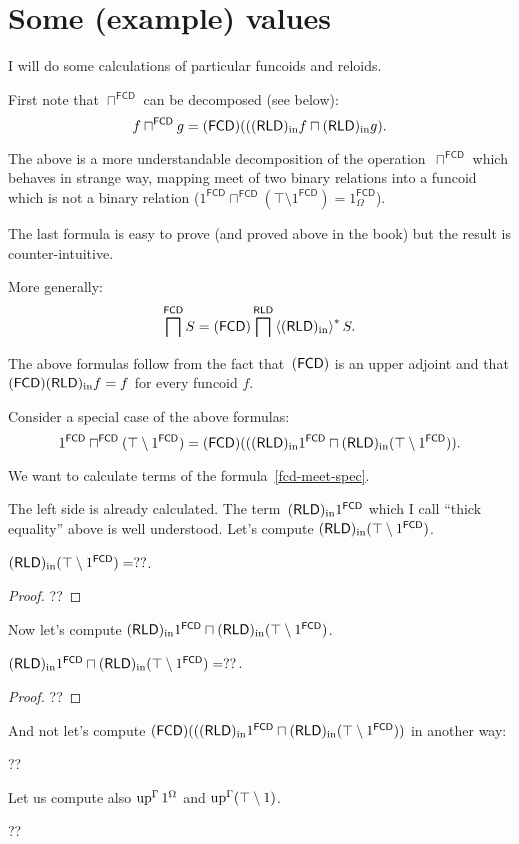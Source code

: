 \chapter{Some (example) values}

I will do some calculations of particular funcoids and reloids.

First note that $\sqcap^{\mathsf{FCD}}$ can be decomposed (see below): \[ f \sqcap^{\mathsf{FCD}} g =
(\mathsf{FCD}) (((\mathsf{RLD})_{\mathrm{in}} f \sqcap (\mathsf{RLD})_{\mathrm{in}} g). \]

The above is a more understandable decomposition of the operation~$\sqcap^{\mathsf{FCD}}$
which behaves in strange way, mapping meet of two binary relations into a funcoid which
is not a binary relation ($1^{\mathsf{FCD}} \sqcap^{\mathsf{FCD}} (\top \setminus 1^{\mathsf{FCD}}) =
1^{\mathsf{FCD}}_{\Omega}$).

The last formula is easy to prove (and proved above in the book) but the result is counter-intuitive.

More generally:
\[ \bigsqcap^{\mathsf{FCD}} S = (\mathsf{FCD}) \bigsqcap^{\mathsf{RLD}} \left\langle (\mathsf{RLD})_{\mathrm{in}}\right\rangle ^{\ast} S. \]

The above formulas follow from the fact that~$(\mathsf{FCD})$ is an upper adjoint
and that $(\mathsf{FCD})(\mathsf{RLD})_{\mathrm{in}} f=f$ for every funcoid $f$.

Consider a special case of the above formulas:
\begin{equation}\label{fcd-meet-spec}
1^{\mathsf{FCD}} \sqcap^{\mathsf{FCD}} (\top \setminus 1^{\mathsf{FCD}}) =
(\mathsf{FCD}) (((\mathsf{RLD})_{\mathrm{in}} 1^{\mathsf{FCD}} \sqcap (\mathsf{RLD})_{\mathrm{in}} (\top \setminus 1^{\mathsf{FCD}})).
\end{equation}

We want to calculate terms of the formula~\eqref{fcd-meet-spec}.

The left side is already calculated. The term~$(\mathsf{RLD})_{\mathrm{in}} 1^{\mathsf{FCD}}$ which I call
``thick equality'' above is well understood. Let's compute $(\mathsf{RLD})_{\mathrm{in}} (\top \setminus 1^{\mathsf{FCD}})$.

\begin{prop}
$(\mathsf{RLD})_{\mathrm{in}} (\top \setminus 1^{\mathsf{FCD}}) = ??$.
\end{prop}

\begin{proof}
??
\end{proof}

Now let's compute $(\mathsf{RLD})_{\mathrm{in}} 1^{\mathsf{FCD}} \sqcap (\mathsf{RLD})_{\mathrm{in}} (\top \setminus 1^{\mathsf{FCD}})$.

\begin{prop}
$(\mathsf{RLD})_{\mathrm{in}} 1^{\mathsf{FCD}} \sqcap (\mathsf{RLD})_{\mathrm{in}} (\top \setminus 1^{\mathsf{FCD}}) = ??$.
\end{prop}

\begin{proof}
??
\end{proof}

And not let's compute $(\mathsf{FCD}) (((\mathsf{RLD})_{\mathrm{in}} 1^{\mathsf{FCD}} \sqcap (\mathsf{RLD})_{\mathrm{in}} (\top \setminus 1^{\mathsf{FCD}}))$
in another way:

??

Let us compute also $\operatorname{up}^{\Gamma} 1^{\Omega}$ and $\operatorname{up}^{\Gamma} (\top \setminus 1)$.

??
